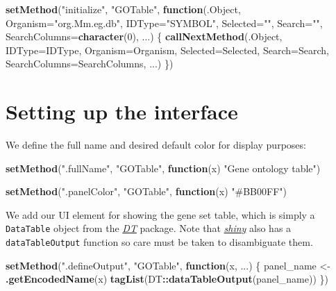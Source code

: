 \documentclass[
]{book}
\newenvironment{Shaded}{\begin{snugshade}}{\end{snugshade}}
\newcommand{\ControlFlowTok}[1]{\textcolor[rgb]{0.13,0.29,0.53}{\textbf{#1}}}
\newcommand{\DataTypeTok}[1]{\textcolor[rgb]{0.13,0.29,0.53}{#1}}
\newcommand{\DecValTok}[1]{\textcolor[rgb]{0.00,0.00,0.81}{#1}}
\newcommand{\KeywordTok}[1]{\textcolor[rgb]{0.13,0.29,0.53}{\textbf{#1}}}
\newcommand{\NormalTok}[1]{#1}
\newcommand{\OperatorTok}[1]{\textcolor[rgb]{0.81,0.36,0.00}{\textbf{#1}}}
\newcommand{\StringTok}[1]{\textcolor[rgb]{0.31,0.60,0.02}{#1}}
\begin{document}
\begin{Shaded}
\begin{Highlighting}[]
\KeywordTok{setMethod}\NormalTok{(}\StringTok{"initialize"}\NormalTok{, }\StringTok{"GOTable"}\NormalTok{, }\ControlFlowTok{function}\NormalTok{(.Object, }
    \DataTypeTok{Organism=}\StringTok{"org.Mm.eg.db"}\NormalTok{, }\DataTypeTok{IDType=}\StringTok{"SYMBOL"}\NormalTok{, }
    \DataTypeTok{Selected=}\StringTok{""}\NormalTok{, }\DataTypeTok{Search=}\StringTok{""}\NormalTok{, }\DataTypeTok{SearchColumns=}\KeywordTok{character}\NormalTok{(}\DecValTok{0}\NormalTok{), ...)}
\NormalTok{\{}
    \KeywordTok{callNextMethod}\NormalTok{(.Object, }\DataTypeTok{IDType=}\NormalTok{IDType, }\DataTypeTok{Organism=}\NormalTok{Organism, }
        \DataTypeTok{Selected=}\NormalTok{Selected, }\DataTypeTok{Search=}\NormalTok{Search, }
        \DataTypeTok{SearchColumns=}\NormalTok{SearchColumns, ...)}
\NormalTok{\})}
\end{Highlighting}
\end{Shaded}

\hypertarget{setting-up-the-interface}{%
\section{Setting up the interface}\label{setting-up-the-interface}}

We define the full name and desired default color for display purposes:

\begin{Shaded}
\begin{Highlighting}[]
\KeywordTok{setMethod}\NormalTok{(}\StringTok{".fullName"}\NormalTok{, }\StringTok{"GOTable"}\NormalTok{, }\ControlFlowTok{function}\NormalTok{(x) }\StringTok{"Gene ontology table"}\NormalTok{)}

\KeywordTok{setMethod}\NormalTok{(}\StringTok{".panelColor"}\NormalTok{, }\StringTok{"GOTable"}\NormalTok{, }\ControlFlowTok{function}\NormalTok{(x) }\StringTok{"#BB00FF"}\NormalTok{)}
\end{Highlighting}
\end{Shaded}

We add our UI element for showing the gene set table, which is simply a \texttt{DataTable} object from the \emph{\href{https://CRAN.R-project.org/package=DT}{DT}} package.
Note that \emph{\href{https://CRAN.R-project.org/package=shiny}{shiny}} also has a \texttt{dataTableOutput} function so care must be taken to disambiguate them.

\begin{Shaded}
\begin{Highlighting}[]
\KeywordTok{setMethod}\NormalTok{(}\StringTok{".defineOutput"}\NormalTok{, }\StringTok{"GOTable"}\NormalTok{, }\ControlFlowTok{function}\NormalTok{(x, ...) \{}
\NormalTok{    panel_name <-}\StringTok{ }\KeywordTok{.getEncodedName}\NormalTok{(x)}
    \KeywordTok{tagList}\NormalTok{(DT}\OperatorTok{::}\KeywordTok{dataTableOutput}\NormalTok{(panel_name))}
\NormalTok{\})}
\end{Highlighting}
\end{Shaded}
\end{document}
